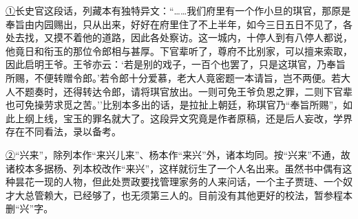 {\href{../Text/part0037_split_000.html\#navto_1_a}{①}长史官这段话，列藏本有独特异文：``\ldots{}\ldots{}我们府里有一个作小旦的琪官，那原是奉旨由内园赐出，只从出来，好好在府里住了不上半年，如今三日五日不见了，各处去找，又摸不着他的道路，因此各处察访。这一城内，十停人到有八停人都说，他竟日和衔玉的那位令郎相与甚厚。下官辈听了，尊府不比别家，可以擅来索取，因此启明王爷。王爷亦云：`若是别的戏子，一百个也罢了，只是这琪官，乃奉旨所赐，不便转赠令郎。'若令郎十分爱慕，老大人竟密题一本请旨，岂不两便。若大人不题奏时，还得转达令郎，请将琪官放出。一则可免王爷负恩之罪，二则下官辈也可免操劳求觅之苦。''比别本多出的话，是拉扯上朝廷，称琪官乃``奉旨所赐''，如此上纲上线，宝玉的罪名就大了。这段异文究竟是作者原稿，还是后人妄改，学界存在不同看法，录以备考。}

{\href{../Text/part0037_split_000.html\#navto_2_a}{②}``兴来''，除列本作``来兴儿来''、杨本作``来兴''外，诸本均同。按``兴来''不通，故诸校本多据杨、列本校改作``来兴''，这样就衍生了一个人名出来。虽然书中偶有这种昙花一现的人物，但此处贾政要找管理家务的人来问话，一个主子贾琏、一个奴才大总管赖大，已经够了，也无须第三人的。目前没有其他更好的校法，暂参程本删``兴''字。}
